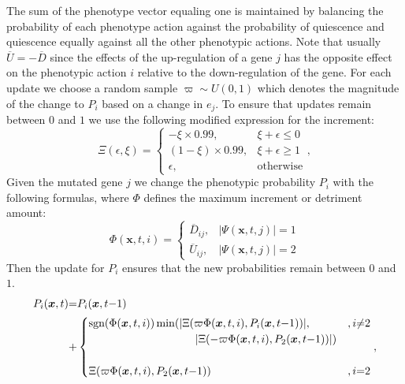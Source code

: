 \documentclass[\main/thesis.tex]{subfiles}
\begin{document}
The sum of the phenotype vector equaling one is maintained by balancing the probability of 
each phenotype action against the probability of quiescence and quiescence equally against all the other phenotypic actions. Note that usually $\overline{U}{=}{-}\overline{D}$ since the effects of the up-regulation of a gene $j$ has the opposite effect on the phenotypic action $i$ relative to the down-regulation of the gene. For each update we choose a random sample $\varpi {\sim} U(0, 1)$ which denotes the magnitude of the change to $P_i$ based on a change in $e_j$. To ensure that updates remain between $0$ and $1$ we use the following modified expression for the increment:
\begin{equation}
\Xi(\epsilon, \xi) {=} \begin{cases}
                          {-}\xi {\times} 0.99,
                           & \xi {+} \epsilon {\le} 0 \\
                          (1 {-} \xi) {\times} 0.99,
                           & \xi {+} \epsilon {\ge} 1 \\
                          \epsilon, & \text{otherwise}
                         \end{cases},
\label{eq:phenotypicActionBoundaryFunction}
\end{equation}
Given the mutated gene $j$ we change the phenotypic probability $P_i$ with the following formulas, where $\Phi$ defines the maximum increment or detriment amount:
\begin{equation}
\Phi(\boldsymbol{x}, t, i) =
\begin{cases}
  \overline{D}_{ij}, &|\Psi(\boldsymbol{x}, t, j)| = 1 \\
  \overline{U}_{ij}, &|\Psi(\boldsymbol{x}, t, j)| = 2
\end{cases}
\label{eq:phenotypeMutateEpsilon}
\end{equation}
Then the update for $P_i$ ensures that the new probabilities remain between $0$ and $1$. 
\begin{align}
P_i(\boldsymbol{x}, t) &{=} P_i(\boldsymbol{x}, t{-}1) \nonumber \\ &{+}
                           \begin{cases}
                             \text{sgn}(\Phi(\boldsymbol{x}, t, i))
                             \min(|\Xi(\varpi \Phi(\boldsymbol{x}, t, i),  
                                   P_i(\boldsymbol{x}, t{-}1))|,   
                               & , i {\ne} 2 \\
                             \hspace{3.4cm} |\Xi({-}\varpi \Phi(\boldsymbol{x}, t, i),  
                                             P_2(\boldsymbol{x}, t{-}1))|)\\
                             \\
                             \Xi(\varpi \Phi(\boldsymbol{x}, t, i), 
                                 P_2(\boldsymbol{x}, t{-}1))
                               & , i {=} 2
                            \end{cases},
\label{eq:phenotypeMutate}
\end{align}
\end{document}
